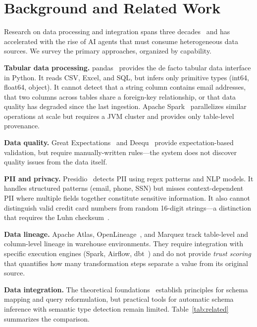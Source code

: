 \documentclass[10pt, twocolumn]{article}
\begin{document}
\section{Background and Related Work}\label{sec:related}

Research on data processing and integration spans three decades~\cite{halevy2006data, abiteboul1995foundations} and has accelerated with the rise of AI agents that must consume heterogeneous data sources. We survey the primary approaches, organized by capability.

\textbf{Tabular data processing.} pandas~\cite{mckinney2010pandas} provides the de facto tabular data interface in Python. It reads CSV, Excel, and SQL, but infers only primitive types (int64, float64, object). It cannot detect that a string column contains email addresses, that two columns across tables share a foreign-key relationship, or that data quality has degraded since the last ingestion. Apache Spark~\cite{apachespark2024} parallelizes similar operations at scale but requires a JVM cluster and provides only table-level provenance.

\textbf{Data quality.} Great Expectations~\cite{greatexpectations2024} and Deequ~\cite{abedjan2016detecting} provide expectation-based validation, but require manually-written rules---the system does not discover quality issues from the data itself.

\textbf{PII and privacy.} Presidio~\cite{presidio2024} detects PII using regex patterns and NLP models. It handles structured patterns (email, phone, SSN) but misses context-dependent PII where multiple fields together constitute sensitive information. It also cannot distinguish valid credit card numbers from random 16-digit strings---a distinction that requires the Luhn checksum~\cite{luhn1960computer}.

\textbf{Data lineage.} Apache Atlas, OpenLineage~\cite{openlineage2024}, and Marquez track table-level and column-level lineage in warehouse environments. They require integration with specific execution engines (Spark, Airflow, dbt~\cite{dbt2024}) and do not provide \emph{trust scoring} that quantifies how many transformation steps separate a value from its original source.

\textbf{Data integration.} The theoretical foundations~\cite{doan2012principles, abiteboul1995foundations} establish principles for schema mapping and query reformulation, but practical tools for automatic schema inference with semantic type detection remain limited. Table~\ref{tab:related} summarizes the comparison.
\end{document}
